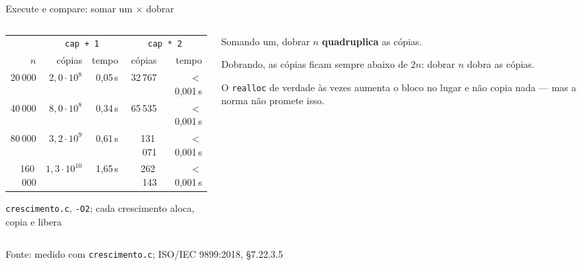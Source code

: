 \documentclass[aspectratio=169]{beamer}
\newcommand{\fonte}[1]{\vfill\hfill{\scriptsize\textcolor{UFSGray}{Fonte: #1}}}
\begin{document}
\begin{frame}{Execute e compare: somar um $\times$ dobrar}
  \begin{columns}[c]
    \begin{column}{0.56\textwidth}
      \begin{center}
      \small
      \begin{tabular}{@{}rrrrr@{}}
        \toprule
        & \multicolumn{2}{c}{\texttt{cap + 1}} & \multicolumn{2}{c}{\texttt{cap * 2}}\\
        \cmidrule(lr){2-3}\cmidrule(l){4-5}
        $n$ & cópias & tempo & cópias & tempo\\
        \midrule
        20\,000  & $2{,}0\cdot 10^{8}$ & 0,05\,s & 32\,767  & $<$0,001\,s\\
        40\,000  & $8{,}0\cdot 10^{8}$ & 0,34\,s & 65\,535  & $<$0,001\,s\\
        80\,000  & $3{,}2\cdot 10^{9}$ & 0,61\,s & 131\,071 & $<$0,001\,s\\
        160\,000 & $1{,}3\cdot 10^{10}$& 1,65\,s & 262\,143 & $<$0,001\,s\\
        \bottomrule
      \end{tabular}

      \medskip
      \scriptsize \texttt{crescimento.c}, \texttt{-O2}; cada crescimento
      aloca, copia e libera
      \end{center}
    \end{column}
    \begin{column}{0.4\textwidth}
      \small
      Somando um, dobrar $n$ \textbf{quadruplica} as cópias.

      \medskip
      Dobrando, as cópias ficam sempre abaixo de $2n$: dobrar $n$ dobra
      as cópias.

      \medskip
      \scriptsize O \texttt{realloc} de verdade às vezes aumenta o bloco no
      lugar e não copia nada --- mas a norma não promete isso.
    \end{column}
  \end{columns}
  \fonte{medido com \texttt{crescimento.c}; ISO/IEC 9899:2018, §7.22.3.5~\cite{iso2018c17}}
\end{frame}
\end{document}

